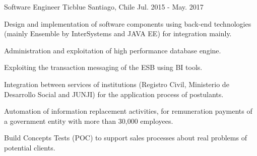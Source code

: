 \begin{cventries}
  \cventry
    {Software Engineer} %
    {Ticblue} %
    {Santiago, Chile} %
    {Jul. 2015 - May. 2017} %
    {
      \begin{cvitems} %
        \item {Design and implementation of software components using back-end technologies (mainly Ensemble by InterSystems and JAVA EE) for integration mainly.}
        \item {Administration and exploitation of high performance database engine.}
        \item {Exploiting the transaction messaging of the ESB using BI tools.}
        \item {Integration between services of institutions (Registro Civil, Ministerio de Desarrollo Social and JUNJI) for the application process of postulants.}
        \item {Automation of information replacement activities, for remuneration payments of a government entity with more than 30,000 employees.}
        \item {Build Concepts Tests (POC) to support sales processes about real problems of potential clients.}
      \end{cvitems}
    }

\end{cventries}
